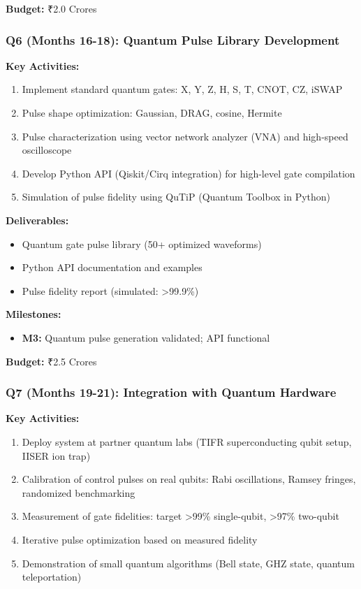 \documentclass[12pt,a4paper]{article}
\begin{document}
\begin{enumerate}[leftmargin=*]
\textbf{Budget:} ₹2.0 Crores

\subsubsection{Q6 (Months 16-18): Quantum Pulse Library Development}

\textbf{Key Activities:}
\begin{enumerate}[leftmargin=*]
    \item Implement standard quantum gates: X, Y, Z, H, S, T, CNOT, CZ, iSWAP
    \item Pulse shape optimization: Gaussian, DRAG, cosine, Hermite
    \item Pulse characterization using vector network analyzer (VNA) and high-speed oscilloscope
    \item Develop Python API (Qiskit/Cirq integration) for high-level gate compilation
    \item Simulation of pulse fidelity using QuTiP (Quantum Toolbox in Python)
\end{enumerate}

\textbf{Deliverables:}
\begin{itemize}[leftmargin=*]
    \item Quantum gate pulse library (50+ optimized waveforms)
    \item Python API documentation and examples
    \item Pulse fidelity report (simulated: >99.9\%)
\end{itemize}

\textbf{Milestones:}
\begin{itemize}[leftmargin=*]
    \item \textbf{M3:} Quantum pulse generation validated; API functional
\end{itemize}

\textbf{Budget:} ₹2.5 Crores

\subsubsection{Q7 (Months 19-21): Integration with Quantum Hardware}

\textbf{Key Activities:}
\begin{enumerate}[leftmargin=*]
    \item Deploy system at partner quantum labs (TIFR superconducting qubit setup, IISER ion trap)
    \item Calibration of control pulses on real qubits: Rabi oscillations, Ramsey fringes, randomized benchmarking
    \item Measurement of gate fidelities: target >99\% single-qubit, >97\% two-qubit
    \item Iterative pulse optimization based on measured fidelity
    \item Demonstration of small quantum algorithms (Bell state, GHZ state, quantum teleportation)
\end{enumerate}


\end{enumerate}
\end{document}
